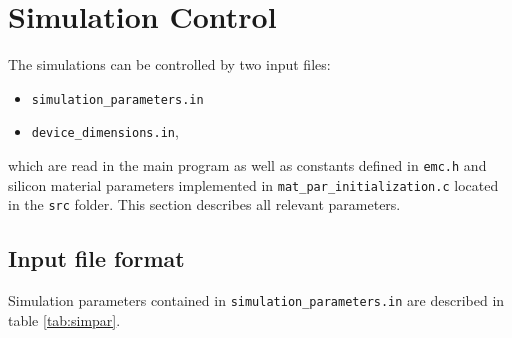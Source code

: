 
\section{Simulation Control} \label{boltzmann:sim}

The simulations can be controlled by two input files:
\begin{itemize}
\item \texttt{simulation\_parameters.in}
\item \texttt{device\_dimensions.in},
\end{itemize}
which are read in the main program as well as constants defined in \texttt{emc.h} and silicon material parameters implemented in \texttt{mat\_par\_initialization.c}
located in the \texttt{src} folder.
This section describes all relevant parameters.

\subsection{Input file format}

Simulation parameters contained in \texttt{simulation\_parameters.in} are described in table \ref{tab:simpar}.

